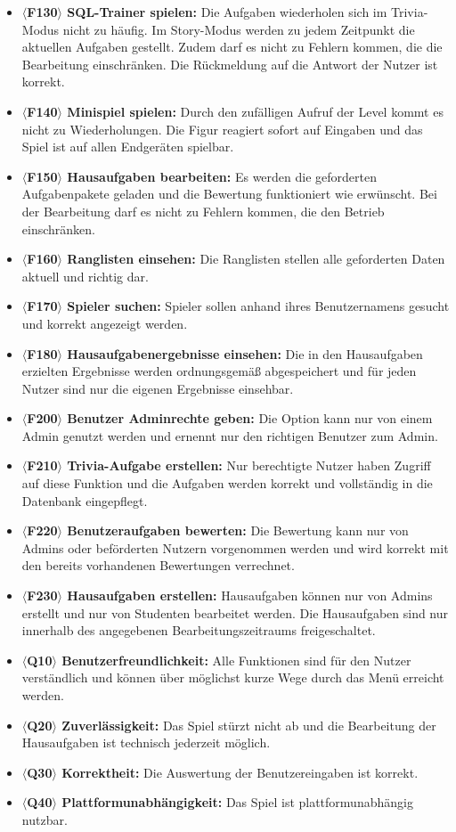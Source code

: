 \begin{itemize}
\item \textbf{$\langle$F130$\rangle$ SQL-Trainer spielen: }Die Aufgaben wiederholen sich im Trivia-Modus nicht zu häufig. Im Story-Modus werden zu jedem Zeitpunkt die aktuellen Aufgaben gestellt. Zudem darf es nicht zu Fehlern kommen, die die Bearbeitung einschränken. Die Rückmeldung auf die Antwort der Nutzer ist korrekt. 
\item \textbf{$\langle$F140$\rangle$ Minispiel spielen: }Durch den zufälligen Aufruf der Level kommt es nicht zu Wiederholungen. Die Figur reagiert sofort auf Eingaben und das Spiel ist auf allen Endgeräten spielbar.
\item \textbf{$\langle$F150$\rangle$ Hausaufgaben bearbeiten: }Es werden die geforderten Aufgabenpakete geladen und die Bewertung funktioniert wie erwünscht. Bei der Bearbeitung darf es nicht zu Fehlern kommen, die den Betrieb einschränken.
\item \textbf{$\langle$F160$\rangle$ Ranglisten einsehen: }Die Ranglisten stellen alle geforderten Daten aktuell und richtig dar.
\item \textbf{$\langle$F170$\rangle$ Spieler suchen: }Spieler sollen anhand ihres Benutzernamens gesucht und korrekt angezeigt werden.
\item \textbf{$\langle$F180$\rangle$ Hausaufgabenergebnisse einsehen: }Die in den Hausaufgaben erzielten Ergebnisse werden ordnungsgemäß abgespeichert und für jeden Nutzer sind nur die eigenen Ergebnisse einsehbar.
\item \textbf{$\langle$F200$\rangle$ Benutzer Adminrechte geben: }Die Option kann nur von einem Admin genutzt werden und ernennt nur den richtigen Benutzer zum Admin.
\item \textbf{$\langle$F210$\rangle$ Trivia-Aufgabe erstellen: }Nur berechtigte Nutzer haben Zugriff auf diese Funktion und die Aufgaben werden korrekt und vollständig in die Datenbank eingepflegt.
\item \textbf{$\langle$F220$\rangle$ Benutzeraufgaben bewerten: }Die Bewertung kann nur von Admins oder beförderten Nutzern vorgenommen werden und wird korrekt mit den bereits vorhandenen Bewertungen verrechnet.
\item \textbf{$\langle$F230$\rangle$ Hausaufgaben erstellen: }Hausaufgaben können nur von Admins erstellt und nur von Studenten bearbeitet werden. Die Hausaufgaben sind nur innerhalb des angegebenen Bearbeitungszeitraums freigeschaltet.
\item \textbf{$\langle$Q10$\rangle$ Benutzerfreundlichkeit: }Alle Funktionen sind für den Nutzer verständlich und können über möglichst kurze Wege durch das Menü erreicht werden.
\item \textbf{$\langle$Q20$\rangle$ Zuverlässigkeit: }Das Spiel stürzt nicht ab und die Bearbeitung der Hausaufgaben ist technisch jederzeit möglich.
\item \textbf{$\langle$Q30$\rangle$ Korrektheit: }Die Auswertung der Benutzereingaben ist korrekt.
\item \textbf{$\langle$Q40$\rangle$ Plattformunabhängigkeit: }Das Spiel ist plattformunabhängig nutzbar.
\end{itemize}
 

